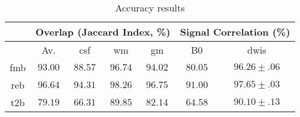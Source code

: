 
\begin{table}[h]
\caption{Accuracy results}
\label{table:results}
\begin{center}
\begin{tabular}{c||cccc|cc}
\hline
 & \multicolumn{4}{c|}{ Overlap (Jaccard Index, \%)} & \multicolumn{2}{c}{ Signal Correlation (\%)} \\
\hline
 & Av. & \gls*{csf} & \gls*{wm} & \gls*{gm} & B0 & \glspl*{dwi} \\
\hline
\gls*{fmb} & $93.00$ & $88.57$ & $96.74$ & $94.02$ & $80.05$ & $96.26\pm.06$ \\
\hline
\gls*{reb} & $96.64$ & $94.31$ & $98.26$ & $96.75$ & $91.00$ & $97.65\pm.03$ \\
\hline
\gls*{t2b} & $79.19$ & $66.31$ & $89.85$ & $82.14$ & $64.58$ & $90.10\pm.13$ \\
\hline
\end{tabular}
\end{center}
\end{table}